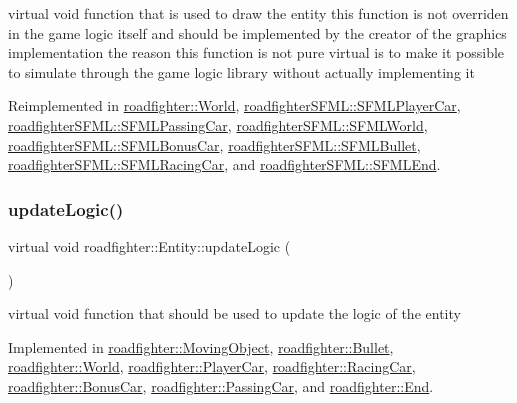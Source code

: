 virtual void function that is used to draw the entity this function is not overriden in the game logic itself and should be implemented by the creator of the graphics implementation the reason this function is not pure virtual is to make it possible to simulate through the game logic library without actually implementing it 

Reimplemented in \hyperlink{classroadfighter_1_1World_a90534263a154d6d7c1e8aef4e0138881}{roadfighter\+::\+World}, \hyperlink{classroadfighterSFML_1_1SFMLPlayerCar_a09685e98ed5357ce9aa87834a89c2a3e}{roadfighter\+S\+F\+M\+L\+::\+S\+F\+M\+L\+Player\+Car}, \hyperlink{classroadfighterSFML_1_1SFMLPassingCar_a6126e27f57541cfce33207260304331a}{roadfighter\+S\+F\+M\+L\+::\+S\+F\+M\+L\+Passing\+Car}, \hyperlink{classroadfighterSFML_1_1SFMLWorld_ac65836bf9c104d4611f63e6640706713}{roadfighter\+S\+F\+M\+L\+::\+S\+F\+M\+L\+World}, \hyperlink{classroadfighterSFML_1_1SFMLBonusCar_a9e17ddeef7127e67ee8a68079def59b9}{roadfighter\+S\+F\+M\+L\+::\+S\+F\+M\+L\+Bonus\+Car}, \hyperlink{classroadfighterSFML_1_1SFMLBullet_a7e46ff1aad9edf3cecb8e88bf386c7b7}{roadfighter\+S\+F\+M\+L\+::\+S\+F\+M\+L\+Bullet}, \hyperlink{classroadfighterSFML_1_1SFMLRacingCar_af03d32b40f2f213936df8afa29b5529c}{roadfighter\+S\+F\+M\+L\+::\+S\+F\+M\+L\+Racing\+Car}, and \hyperlink{classroadfighterSFML_1_1SFMLEnd_a3b2b22f599e8011b8e2a83fd5aadee9f}{roadfighter\+S\+F\+M\+L\+::\+S\+F\+M\+L\+End}.

\mbox{\label{classroadfighter_1_1Entity_a54c00f1af306290bae3e4b84e196566b}} 
\subsubsection{\texorpdfstring{update\+Logic()}{updateLogic()}}
{\footnotesize\ttfamily virtual void roadfighter\+::\+Entity\+::update\+Logic (\begin{DoxyParamCaption}{ }\end{DoxyParamCaption})\hspace{0.3cm}{\ttfamily [pure virtual]}}

virtual void function that should be used to update the logic of the entity 

Implemented in \hyperlink{classroadfighter_1_1MovingObject_a2c5d69054a59fc5c6d7458f864ee9d57}{roadfighter\+::\+Moving\+Object}, \hyperlink{classroadfighter_1_1Bullet_a13aa730279ee8590d0eb2f9e6c01f265}{roadfighter\+::\+Bullet}, \hyperlink{classroadfighter_1_1World_a066592a75c8a38e241013707b429206c}{roadfighter\+::\+World}, \hyperlink{classroadfighter_1_1PlayerCar_a01480487ca7978a50a3c6609f1ebe6df}{roadfighter\+::\+Player\+Car}, \hyperlink{classroadfighter_1_1RacingCar_af3f3b4c368ba61c13dc9b99004895c5d}{roadfighter\+::\+Racing\+Car}, \hyperlink{classroadfighter_1_1BonusCar_a21d55ad1e1595ac6c86ca20f8819778b}{roadfighter\+::\+Bonus\+Car}, \hyperlink{classroadfighter_1_1PassingCar_ac3fe3087290121bf44880f94efa3a916}{roadfighter\+::\+Passing\+Car}, and \hyperlink{classroadfighter_1_1End_aee4a4fed3e7bd5f85f183351280e54f9}{roadfighter\+::\+End}.

